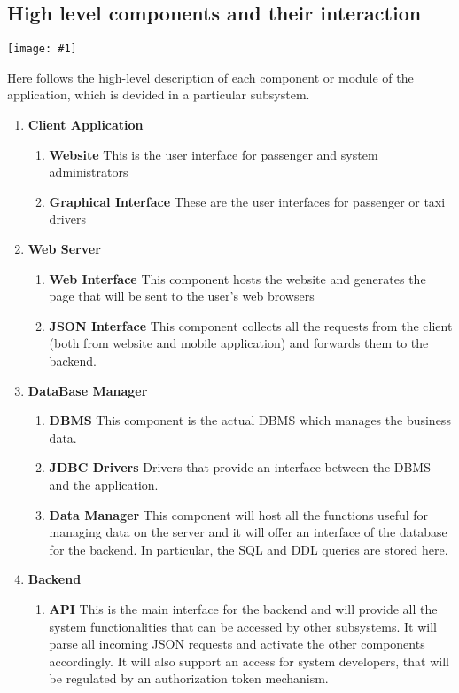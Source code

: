 \documentclass[11pt, a4paper,titlepage]{article}
\newcommand{\image}[1]{
	\begin{center}
		\noindent \texttt{[image: \#1]}
	\end{center}
	}
\begin{document}
\subsection{High level components and their interaction}
\image{diagram_components_hilevel.png}
\newpage
 Here follows the high-level description of each component or module of the application, which is devided in a particular subsystem.
 \begin{enumerate}
 	\item \textbf{Client Application}
 	 \begin{enumerate}
 	 	\item \label{itm:Component_Website} \textbf{Website} This is the user interface for passenger and system administrators
 	 	\item \label{itm:Component_GUI} \textbf{Graphical Interface} These are the user interfaces for passenger or taxi drivers
 	 \end{enumerate}
 	\item \textbf{Web Server}
	 	\begin{enumerate}
	 		\item \label{itm:Component_WebInterface} \textbf{Web Interface} This component hosts the website and generates the page that will be sent to the user's web browsers
	 		\item \label{itm:Component_JSONInterface} \textbf{JSON Interface} This component collects all the requests from the client (both from website and mobile application) and forwards them to the backend.
	 	\end{enumerate}
 	\item \textbf{DataBase Manager}
 		 	\begin{enumerate}
 		 		\item \label{itm:Component_DBMS} \textbf{DBMS} This component is the actual DBMS which manages the business data.
 		 		\item \label{itm:Component_JDBC} \textbf{JDBC Drivers} Drivers that provide an interface between the DBMS and the application.
 		 		\item \label{itm:Component_DataManager} \textbf{Data Manager} This component will host all the functions useful for managing data on the server and it will offer an interface of the database for the backend. In particular, the SQL and DDL queries are stored here.
 		 	\end{enumerate}
 	\item \textbf{Backend}
		 	\begin{enumerate}
		 		\item \label{itm:Component_API} \textbf{API} This is the main interface for the backend and will provide all the system functionalities that can be accessed by other subsystems. It will parse all incoming JSON requests and activate the other components accordingly. It will also support an access for system developers, that will be regulated by an authorization token mechanism.

\end{enumerate}
\end{enumerate}
\end{document}

